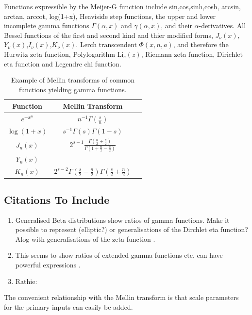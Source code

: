 \documentclass{article}
\begin{document}
Functions expressible by the Meijer-G function include sin,cos,sinh,cosh, arcsin, arctan, arccot, log(1+x), Heaviside step functions, the upper and lower incomplete gamma functions $\Gamma(\alpha,x)$ and $\gamma(\alpha,x)$, and their $\alpha$-derivatives. All Bessel functions of the first and second kind and thier modified forms, $J_\nu(x)$,$Y_\nu(x)$,$I_\nu(x)$,$K_\nu(x)$. Lerch transcendent $\Phi(x,n,a)$, {\color{red} and therefore the Hurwitz zeta function, Polylogarithm $\mathrm{Li}_s(z)$, Riemann zeta function, Dirichlet eta function and Legendre chi function}.

\begin{table}
\begin{tabular}{|c|c|c|}
\hline
Function & Mellin Transform\\
\hline
$e^{-x^n}$ & $n^{-1}\Gamma(\frac{s}{n})$ \\
$\log(1+x)$ & $s^{-1}\Gamma(s)\Gamma(1-s)$ \\
$J_n(x)$ & $2^{s-1}\frac{\Gamma(\frac{n}{2}+\frac{s}{2})}{\Gamma(1+\frac{n}{2}-\frac{s}{2})}$ \\
$Y_n(x)$ & $ $ \\
$K_n(x)$ & $2^{s-2}\Gamma(\frac{s}{2}-\frac{n}{2})\Gamma(\frac{s}{2}+\frac{n}{2})$ \\
\hline
\end{tabular}
\caption{Example of Mellin transforms of common functions yielding gamma functions.}
\end{table}



\subsection{Citations To Include}
\begin{enumerate}
\item Generalised Beta distributions show ratios of gamma functions. Make it possible to represent (elliptic?) or generalisations of the Dirchlet eta function? Alog with generalisations of the zeta function \citep{ostrovsky2013theory}.
\item This seems to show ratios of extended gamma functions etc. can have powerful expressions \citep{Luo2013}.
\item Rathie: %
\end{enumerate}
The convenient relationship with the Mellin transform is that scale parameters for the primary inputs can easily be added.
\end{document}
